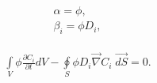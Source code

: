 \documentclass[a4paper,14pt,english]{extreport}
\begin{document}
  \begin{eqnarray}
 \begin{gathered}
 \label{eq:alpha}
 \alpha  =  \phi, \\ 
 \beta_{i}  = \phi D_{i},
 \end{gathered}
 \end{eqnarray}
 
   \begin{eqnarray}
 \label{eq:diffusuin_multicomp_integral}
 \int \limits_{V} \phi \frac{\partial C_{i}}{\partial t} d V - \oint \limits_{S} \phi D_{i} \vec{\nabla}C_{i} \; \vec{dS} = 0.
 \end{eqnarray}
 
\end{document}

